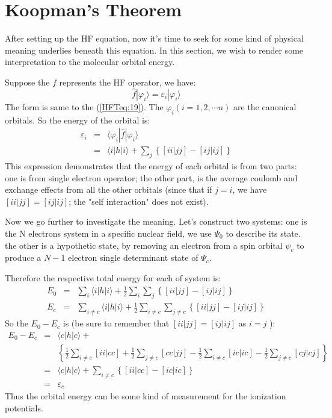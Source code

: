 \section{Koopman's Theorem}
After setting up the HF equation, now it's time to seek for some
kind of physical meaning underlies beneath this equation. In this
section, we wish to render some interpretation to the molecular
orbital energy.

Suppose the $f$ represents the HF operator, we have:
\begin{equation}\label{}
\hat{f} | \varphi_{i} \rangle = \varepsilon_{i} | \varphi_{i}
\rangle
\end{equation}
The form is same to the (\ref{HFTeq:19}). The $\varphi_{i}
(i=1,2,\cdots n)$ are the canonical orbitals. So the energy of the
orbital is:
\begin{eqnarray}
  \varepsilon_{i} &=&  \langle \varphi_{i}| \hat{f} | \varphi_{i} \rangle \nonumber \\
    &=& \langle i|h|i \rangle + \sum_{j} \left\{
[ii|jj] - [ij|ij]
    \right\}
\end{eqnarray}
This expression demonstrates that the energy of each orbital is from
two parts: one is from single electron operator; the other part, is
the average coulomb and exchange effects from all the other orbitals
(since that if $j=i$, we have $[ii|jj] = [ij|ij]$; the "self
interaction" does not exist).

Now we go further to investigate the meaning. Let's construct two
systems: one is the N electrons system in a specific nuclear field,
we use $\Psi_{0}$ to describe its state. the other is a hypothetic
state, by removing an electron from a spin orbital $\psi_{c}$ to
produce a $N-1$ electron single determinant state of $\Psi_{c}$.

Therefore the respective total energy for each of system is:
\begin{eqnarray}
  E_{0} &=& \sum_{i} \langle i|h|i \rangle + \frac{1}{2}\sum_{i}\sum_{j} \left\{
[ii|jj] - [ij|ij]
    \right\}  \nonumber \\
  E_{c} &=& \sum_{i\neq c} \langle i|h|i \rangle + \frac{1}{2}\sum_{i \neq c}\sum_{j \neq c} \left\{
[ii|jj] - [ij|ij]
    \right\}
\end{eqnarray}
So the $E_{0} - E_{c}$ is (be sure to remember that $[ii|jj] =
[ij|ij]$ as $i=j$ ):
\begin{eqnarray}
  E_{0} - E_{c} &=& \langle c|h|c \rangle +   \nonumber \\
                & & \left\{
\frac{1}{2}\sum_{i \neq c}[ii|cc] + \frac{1}{2}\sum_{j \neq c}
[cc|jj] - \frac{1}{2}\sum_{i \neq c}[ic|ic] - \frac{1}{2}\sum_{j
\neq c} [cj|cj]
  \right\} \nonumber \\
   &=& \langle c|h|c \rangle +  \sum_{i \neq c} \left\{
[ii|cc] - [ic|ic]
    \right\} \nonumber \\
   &=& \varepsilon_{c}
\end{eqnarray}
Thus the orbital energy can be some kind of measurement for the
ionization potentials.

